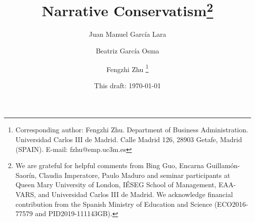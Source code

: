\documentclass[letterpaper,12pt]{article}
\begin{document}
	
	\title{\textbf{Narrative Conservatism}\footnote{We are grateful for helpful comments from Bing Guo, Encarna Guillam\'on-Saor\'in, Claudia Imperatore, Paulo Maduro and seminar participants at Queen Mary University of London, IÉSEG School of Management, EAA-VARS, and Universidad Carlos III de Madrid. We acknowledge financial contribution from the Spanish Ministry of Education and Science (ECO2016-77579 and PID2019-111143GB).}}
		
	\author{\normalsize \vspace{1cm}Juan Manuel Garc\'ia Lara}
	
	\author{Beatriz Garc\'ia Osma}
	
	\author{Fengzhi Zhu%
		\thanks{Corresponding author: Fengzhi Zhu. Department of Business Administration. Universidad Carlos III de Madrid. Calle Madrid 126, 28903 Getafe, Madrid (SPAIN). E-mail: fzhu@emp.uc3m.es}}
	
	
	\date{\small This draft: \today}
	
	\maketitle
	
\end{document}
